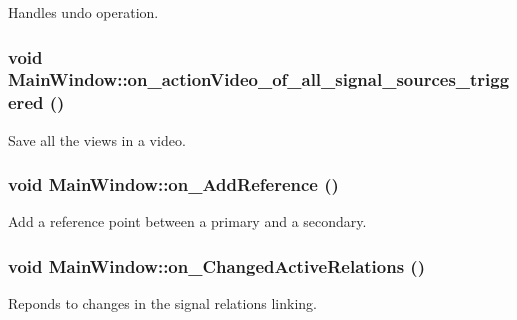 Handles undo operation. 

\hypertarget{class_main_window_65b9aa01299e206a748a8b7af02bb08d}{
\subsubsection[{on\_\-actionVideo\_\-of\_\-all\_\-signal\_\-sources\_\-triggered}]{\setlength{\rightskip}{0pt plus 5cm}void MainWindow::on\_\-actionVideo\_\-of\_\-all\_\-signal\_\-sources\_\-triggered ()}}
\label{class_main_window_65b9aa01299e206a748a8b7af02bb08d}


Save all the views in a video. \hypertarget{class_main_window_ea272096be6230d7d0e5d398004642ad}{
\subsubsection[{on\_\-AddReference}]{\setlength{\rightskip}{0pt plus 5cm}void MainWindow::on\_\-AddReference ()}}
\label{class_main_window_ea272096be6230d7d0e5d398004642ad}


Add a reference point between a primary and a secondary. 

\hypertarget{class_main_window_038f3aa22e535c8e1255cedfe80fe9e4}{
\subsubsection[{on\_\-ChangedActiveRelations}]{\setlength{\rightskip}{0pt plus 5cm}void MainWindow::on\_\-ChangedActiveRelations ()}}
\label{class_main_window_038f3aa22e535c8e1255cedfe80fe9e4}


Reponds to changes in the signal relations linking. 

